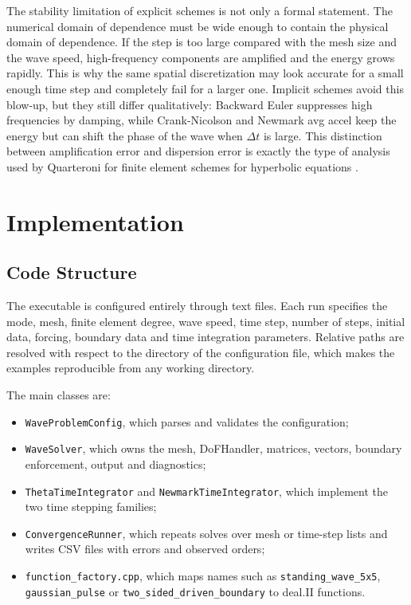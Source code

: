 \documentclass[11pt,a4paper]{article}
\newcommand{\dt}{\Delta t}
\begin{document}
The stability limitation of explicit schemes is not only a formal statement.
The numerical domain of dependence must be wide enough to contain the physical
domain of dependence.  If the step is too large compared with the mesh size and
the wave speed, high-frequency components are amplified and the energy grows
rapidly.  This is why the same spatial discretization may look accurate for a
small enough time step and completely fail for a larger one.  Implicit schemes
avoid this blow-up, but they still differ qualitatively: Backward Euler
suppresses high frequencies by damping, while Crank-Nicolson and Newmark avg
accel keep the energy but can shift the phase of the wave when $\dt$ is large.
This distinction between amplification error and dispersion error is exactly
the type of analysis used by Quarteroni for finite element schemes for
hyperbolic equations \cite{quarteroni}.

\section{Implementation}

\subsection{Code Structure}

The executable is configured entirely through text files.  Each run specifies
the mode, mesh, finite element degree, wave speed, time step, number of steps,
initial data, forcing, boundary data and time integration parameters.  Relative
paths are resolved with respect to the directory of the configuration file,
which makes the examples reproducible from any working directory.

The main classes are:
\begin{itemize}
\item \texttt{WaveProblemConfig}, which parses and validates the configuration;
\item \texttt{WaveSolver}, which owns the mesh, DoFHandler, matrices, vectors,
      boundary enforcement, output and diagnostics;
\item \texttt{ThetaTimeIntegrator} and \texttt{NewmarkTimeIntegrator}, which
      implement the two time stepping families;
\item \texttt{ConvergenceRunner}, which repeats solves over mesh or time-step
      lists and writes CSV files with errors and observed orders;
\item \texttt{function\_factory.cpp}, which maps names such as
      \texttt{standing\_wave\_5x5}, \texttt{gaussian\_pulse} or
      \texttt{two\_sided\_driven\_boundary} to deal.II functions.
\end{itemize}
\end{document}
